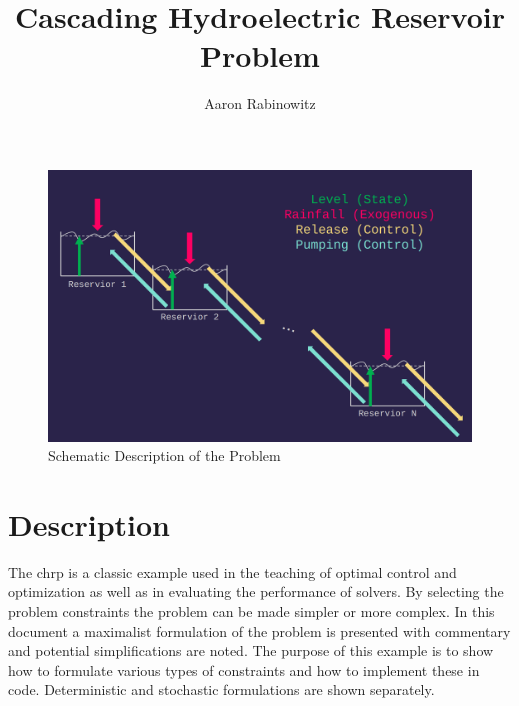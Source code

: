 \documentclass[12pt]{article}
\title{Cascading Hydroelectric Reservoir Problem}
\author{Aaron Rabinowitz}
\date{}
\begin{document}
\maketitle

\begin{figure}[H]
	\centering
	\includegraphics[width=\linewidth]{figs/Schematic.png}
	\caption{Schematic Description of the Problem}
	\label{fig:schematic}
\end{figure}

\section*{Description}

The \gls{chrp} is a classic example used in the teaching of optimal control and optimization as well as in evaluating the performance of solvers. By selecting the problem constraints the problem can be made simpler or more complex. In this document a maximalist formulation of the problem is presented with commentary and potential simplifications are noted. The purpose of this example is to show how to formulate various types of constraints and how to implement these in code. Deterministic and stochastic formulations are shown separately.
\end{document}
